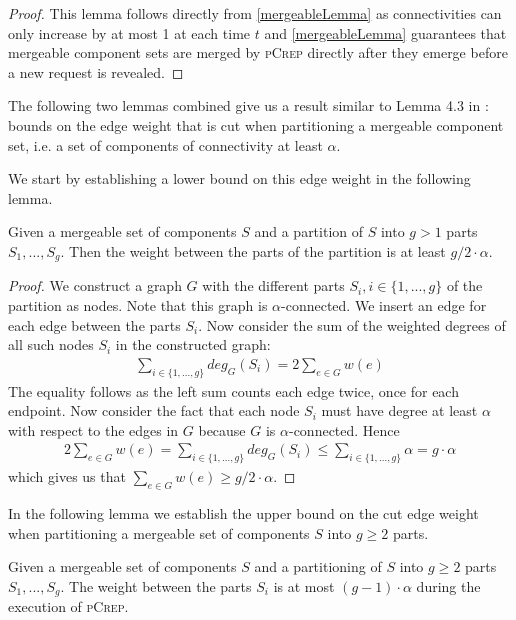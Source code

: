 \documentclass[a4paper,UKenglish,cleveref, autoref, thm-restate,authorcolumns]{../lipics/lipics-v2019}
\newcommand{\adjDel}{\textsc{pCrep}}
\begin{document}
\begin{proof}
	This lemma follows directly from \cref{mergeableLemma} as connectivities can only increase by at most 1 at each time $t$ and \cref{mergeableLemma} guarantees that mergeable component sets are merged by \adjDel{} directly after they emerge before a new request is revealed.
\end{proof}

The following two lemmas combined give us a result similar to Lemma 4.3 in \cite{Avin2015}: bounds on the edge weight that is cut when partitioning a mergeable component set, i.e. a set of components of connectivity at least $\alpha$.

We start by establishing a lower bound on this edge weight in the following lemma.

\begin{lemma}
	\label{cut_lemma}
	Given a mergeable set of components $S$ and a partition of $S$ into $g>1$ parts $S_1,...,S_g$. Then the weight between the parts of the partition is at least $g/2 \cdot \alpha$.
\end{lemma}

\begin{proof}
	We construct a graph $G$ with the different parts $S_i, i\in\{1,...,g\}$ of the partition as nodes. Note that this graph is $\alpha$-connected. We insert an edge for each edge between the parts $S_i$. Now consider the sum of the weighted degrees of all such nodes $S_i$ in the constructed graph:
	\begin{align*}
	\sum_{i\in\{1,...,g\}}deg_G(S_i)=2\sum_{e\in G}w(e)
	\end{align*}
	The equality follows as the left sum counts each edge twice, once for each endpoint.
	Now consider the fact that each node $S_i$ must have degree at least $\alpha$ with respect to the edges in $G$ because $G$ is $\alpha$-connected. Hence
	\begin{align*}
	2\sum_{e\in G}w(e)=\sum_{i\in\{1,...,g\}}deg_G(S_i)\leq\sum_{i\in\{1,...,g\}}\alpha=g\cdot\alpha
	\end{align*}
	which gives us that $\sum_{e\in G}w(e)\geq g/2\cdot\alpha$.
\end{proof}

In the following lemma we establish the upper bound on the cut edge weight when partitioning a mergeable set of components $S$ into $g\geq2$ parts.

\begin{lemma}
	\label{cut_lemma_upper}
	Given a mergeable set of components $S$ and a partitioning of $S$ into $g\geq2$ parts $S_1,...,S_g$. The weight between the parts $S_i$ is at most $(g-1)\cdot\alpha$ during the execution of \adjDel{}.
\end{lemma}
\end{document}
